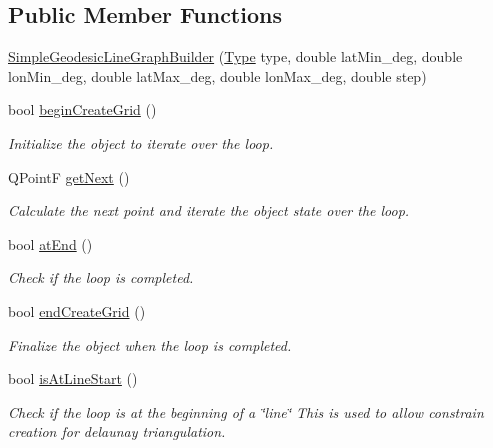 \subsection*{Public Member Functions}
\begin{DoxyCompactItemize}
\item 
\mbox{\hyperlink{classdisplace_1_1graphbuilders_1_1_simple_geodesic_line_graph_builder_a7124fbe267c2824105bceeadb08f8e4f}{Simple\+Geodesic\+Line\+Graph\+Builder}} (\mbox{\hyperlink{classdisplace_1_1graphbuilders_1_1_simple_geodesic_line_graph_builder_a992a295d1a98448230c6402d901933c7}{Type}} type, double lat\+Min\+\_\+deg, double lon\+Min\+\_\+deg, double lat\+Max\+\_\+deg, double lon\+Max\+\_\+deg, double step)
\item 
bool \mbox{\hyperlink{classdisplace_1_1graphbuilders_1_1_simple_geodesic_line_graph_builder_a87d7dbaefebb501f491fc4bb2afeb8eb}{begin\+Create\+Grid}} ()
\begin{DoxyCompactList}\small\item\em Initialize the object to iterate over the loop. \end{DoxyCompactList}\item 
Q\+PointF \mbox{\hyperlink{classdisplace_1_1graphbuilders_1_1_simple_geodesic_line_graph_builder_a219f40fcae3c1463aa7f818687ed5f39}{get\+Next}} ()
\begin{DoxyCompactList}\small\item\em Calculate the next point and iterate the object state over the loop. \end{DoxyCompactList}\item 
bool \mbox{\hyperlink{classdisplace_1_1graphbuilders_1_1_simple_geodesic_line_graph_builder_ae78f3efefaef598263c297686ecd7465}{at\+End}} ()
\begin{DoxyCompactList}\small\item\em Check if the loop is completed. \end{DoxyCompactList}\item 
bool \mbox{\hyperlink{classdisplace_1_1graphbuilders_1_1_simple_geodesic_line_graph_builder_a61e96188c1a6eb7366bc252e9a5f7d53}{end\+Create\+Grid}} ()
\begin{DoxyCompactList}\small\item\em Finalize the object when the loop is completed. \end{DoxyCompactList}\item 
bool \mbox{\hyperlink{classdisplace_1_1graphbuilders_1_1_simple_geodesic_line_graph_builder_ab13312aee2a6410568267d4c697f34c7}{is\+At\+Line\+Start}} ()
\begin{DoxyCompactList}\small\item\em Check if the loop is at the beginning of a \char`\"{}line\char`\"{} This is used to allow constrain creation for delaunay triangulation. \end{DoxyCompactList}\end{DoxyCompactItemize}


